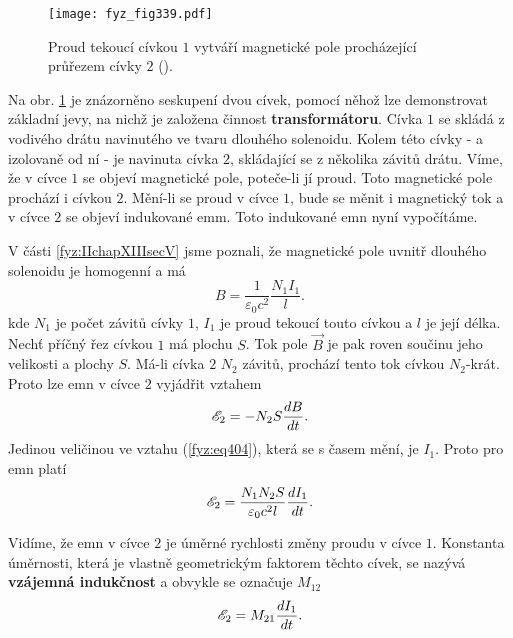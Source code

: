   \begin{figure}[ht!]  %
    \centering
    \texttt{[image: fyz\_fig339.pdf]}
    \caption{Proud tekoucí cívkou \(1\) vytváří magnetické pole procházející průřezem cívky \(2\)
             (\cite[s.~304]{Feynman02}).}
    \label{fyz:fig339}
  \end{figure}
  
  Na obr. \ref{fyz:fig339} je znázorněno seskupení dvou cívek, pomocí něhož lze demonstrovat 
  základní jevy, na nichž je založena činnost \textbf{transformátoru}. Cívka \(1\) se skládá z 
  vodivého drátu navinutého ve tvaru dlouhého solenoidu. Kolem této cívky - a izolovaně od ní - je 
  navinuta cívka \(2\), skládající se z několika závitů drátu. Víme, že v cívce \(1\) se objeví 
  magnetické pole, poteče-li jí proud. Toto magnetické pole prochází i cívkou \(2\). Mění-li se 
  proud v cívce \(1\), bude se měnit i magnetický tok a v cívce \(2\) se objeví indukované emm. 
  Toto indukované emn nyní vypočítáme.
  
  V části \ref{fyz:IIchapXIIIsecV} jsme poznali, že magnetické pole uvnitř dlouhého solenoidu je 
  homogenní a má
  \begin{equation}\label{fyz:eq404}
    B = \frac{1}{\varepsilon_0c^2}\frac{N_1I_1}{l}.
  \end{equation}
  kde \(N_1\) je počet závitů cívky \(1\), \(I_1\) je proud tekoucí touto cívkou a \(l\) je její 
  délka. Nechť příčný řez cívkou \(1\) má plochu \(S\). Tok pole \(\vec{B}\) je pak roven součinu 
  jeho velikosti a plochy \(S\). Má-li cívka \(2\) \(N_2\) závitů, prochází tento tok cívkou 
  \(N_2\)-krát. Proto lze emn v cívce \(2\) vyjádřit vztahem
  \begin{equation}\label{fyz:eq405}
    \mathscr{E}_2 = -N_2S\dfrac{d B}{d t}.
  \end{equation}
  Jedinou veličinou ve vztahu (\ref{fyz:eq404}), která se s časem mění, je \(I_1\). Proto pro emn 
  platí
  \begin{equation}\label{fyz:eq406}
    \mathscr{E}_2 = \frac{N_1N_2S}{\varepsilon_0c^2l}\dfrac{d I_1}{d t}.
  \end{equation}
  
  Vidíme, že emn v cívce \(2\) je úměrné rychlosti změny proudu v cívce \(1\). Konstanta úměrnosti, 
  která je vlastně geometrickým faktorem těchto cívek, se nazývá \textbf{vzájemná indukčnost} a 
  obvykle se označuje \(M_{12}\)
  \begin{equation}\label{fyz:eq407}
    \mathscr{E}_2 = M_{21}\dfrac{d I_1}{d t}.
  \end{equation}
  
